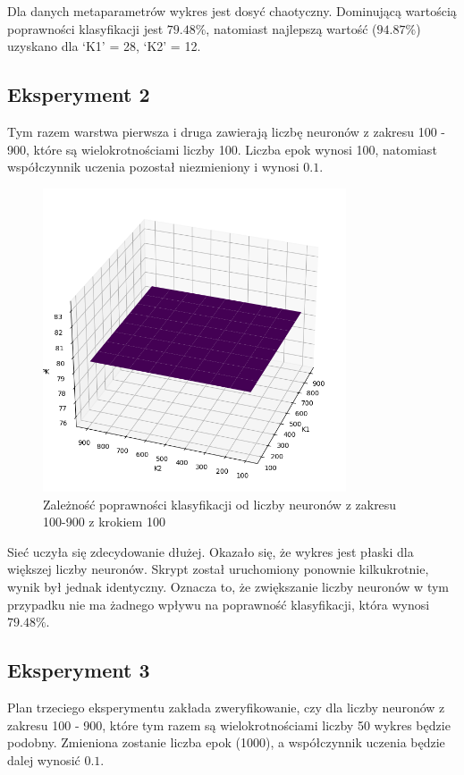 \documentclass{article}
\begin{document}
Dla danych metaparametrów wykres jest dosyć chaotyczny.
Dominującą wartością poprawności klasyfikacji jest $79.48\%$, natomiast najlepszą wartość ($94.87\%$) uzyskano dla `K1' = 28, `K2' = 12.

\newpage
\subsection{Eksperyment 2}
Tym razem warstwa pierwsza i druga zawierają liczbę neuronów z zakresu 100 - 900, które są wielokrotnościami liczby 100.
Liczba epok wynosi 100, natomiast współczynnik uczenia pozostał niezmieniony i wynosi $0.1$.
\begin{figure}[H]
    \centering
    \includegraphics[width=0.8\textwidth, keepaspectratio]{k1_k2_dobre_900k1k2_echo100.png}
    \caption{Zależność poprawności klasyfikacji od liczby neuronów z zakresu 100-900 z krokiem 100}
    \label{fig:k1k2_2}
\end{figure}

Sieć uczyła się zdecydowanie dłużej.
Okazało się, że wykres jest płaski dla większej liczby neuronów.
Skrypt został uruchomiony ponownie kilkukrotnie, wynik był jednak identyczny.
Oznacza to, że zwiększanie liczby neuronów w tym przypadku nie ma żadnego wpływu na poprawność klasyfikacji, która wynosi $79.48\%$.

\newpage
\subsection{Eksperyment 3}
Plan trzeciego eksperymentu zakłada zweryfikowanie, czy dla liczby neuronów z zakresu 100 - 900, które tym razem są wielokrotnościami liczby 50 wykres będzie podobny.
Zmieniona zostanie liczba epok (1000), a współczynnik uczenia będzie dalej wynosić $0.1$.
\end{document}

